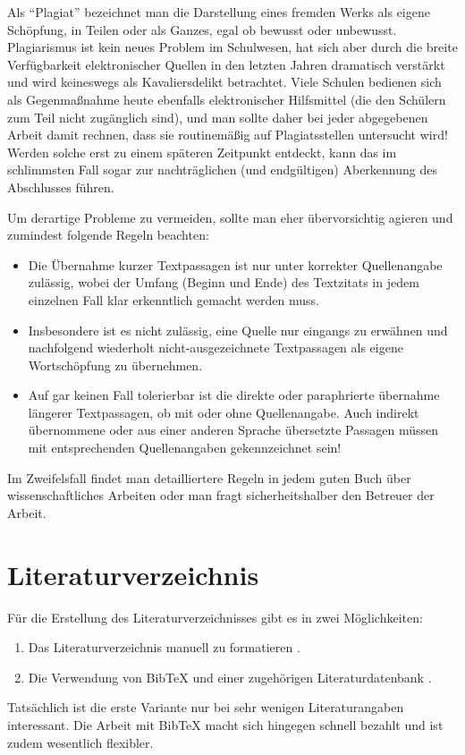 Als "`Plagiat"' bezeichnet man die Darstellung eines fremden Werks als eigene Schöpfung, 
in Teilen oder als Ganzes, egal ob bewusst oder unbewusst.
Plagiarismus ist kein neues Problem im Schulwesen, hat sich aber durch die 
breite Verfügbarkeit elektronischer Quellen in den letzten Jahren dramatisch 
verstärkt und wird keineswegs als Kavaliersdelikt betrachtet.
Viele Schulen bedienen sich als Gegenmaßnahme heute ebenfalls elektronischer Hilfsmittel 
(die den Schülern zum Teil nicht zugänglich sind), und man sollte daher bei
jeder abgegebenen Arbeit damit rechnen, dass sie routinemäßig auf Plagiatsstellen untersucht wird!
Werden solche erst zu einem späteren Zeitpunkt entdeckt, kann das im schlimmsten Fall sogar 
zur nachträglichen (und endgültigen) Aberkennung des Abschlusses führen.

Um derartige Probleme zu vermeiden, sollte man eher übervorsichtig agieren und zumindest folgende Regeln beachten:
%
\begin{itemize}
\item
Die Übernahme kurzer Textpassagen ist nur unter korrekter Quellenangabe zulässig, wobei der Umfang (Beginn und Ende) des Textzitats in jedem einzelnen Fall klar erkenntlich gemacht werden muss. 
\item
Insbesondere ist es nicht zulässig, eine Quelle nur eingangs zu erwähnen und nachfolgend wiederholt nicht-ausgezeichnete Textpassagen als eigene Wortschöpfung zu übernehmen. 
\item
Auf gar keinen Fall tolerierbar ist die direkte oder paraphrierte übernahme längerer Textpassagen, ob mit oder ohne Quellenangabe. Auch indirekt übernommene oder aus einer anderen Sprache übersetzte Passagen müssen mit entsprechenden Quellenangaben gekennzeichnet sein! 
\end{itemize}
%
Im Zweifelsfall findet man detailliertere Regeln in jedem guten Buch über wissenschaftliches Arbeiten oder man fragt sicherheitshalber den Betreuer der Arbeit.



\section{Literaturverzeichnis}

Für die Erstellung des Literaturverzeichnisses gibt es in \latex zwei
Möglichkeiten:
\begin{enumerate}
\item Das Literaturverzeichnis manuell zu formatieren \cite[siehe][S.\ 56--57]{Kopka98}.
\item Die Verwendung von BibTeX und einer zugehörigen Literaturdatenbank
\cite[siehe][S.\ 245--255]{Kopka98}.
\end{enumerate}
Tatsächlich ist die erste Variante nur bei sehr wenigen Literaturangaben interessant.
Die Arbeit mit BibTeX macht sich hingegen schnell bezahlt und ist zudem wesentlich
flexibler.

